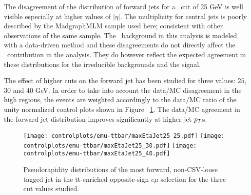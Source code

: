 The disagreement of the \etac distribution of forward jets for a \pt\ cut of 25 GeV is well visible especially at higher values of $|\eta|$. The multiplicity for central jets is poorly described by the MadgraphMLM sample used here; consistent with other observations of the same sample. The \ttbar\ background in this analysis is modeled with a data-driven method and these disagreements do not directly affect the \ttbar\ contribution in the analysis. They do however reflect the expected agreement in these distributions for the irreducible backgrounds and the signal.

The effect of higher \pt cuts on the forward jet has been studied for three values: $25$, $30$ and $40$ GeV. In order to take into account the data/MC disagreement in the high \etac regions, the events are weighted accordingly to the data/MC ratio of the unity normalized control plots shown in Figure ~\ref{fig:ptCutVar}. The data/MC agreement in the forward jet \etac distribution improves significantly at higher jet $p_T$s.

\begin{figure} [!h]
  \centering
  \texttt{[image: controlplots/emu-ttbar/maxEtaJet25\_25.pdf]}
  \texttt{[image: controlplots/emu-ttbar/maxEtaJet25\_30.pdf]}
  \texttt{[image: controlplots/emu-ttbar/maxEtaJet25\_40.pdf]}\\
\caption[Most forward jets \etac distributions]{Pseudorapidity distributions of the most forward, non-CSV-loose tagged jet in the tt-enriched opposite-sign $e\mu$ selection for the three \pt cut values studied.}
\label{fig:ptCutVar}
\end{figure}

